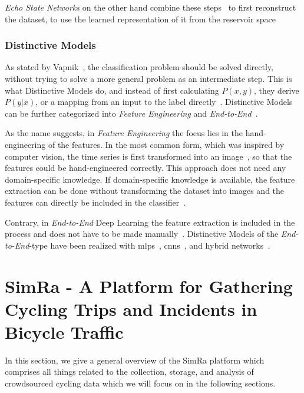 \textit{Echo State Networks} on the other hand combine these steps~\cite{jaeger2001echo} to first reconstruct the dataset, to use the learned representation of it from the reservoir space~\cite{aswolinskiy2018time,bianchi2020reservoir,chouikhi2018genesis,ma2016functional}

\subsubsection*{Distinctive Models}
As stated by Vapnik~\cite{vapnik1998statistical}, the classification problem should be solved directly, without trying to solve a more general problem as an intermediate step.
This is what Distinctive Models do, and instead of first calculating $P(x,y)$, they derive $P(y|x)$, or a mapping from an input to the label directly~\cite{ng2001discriminative}.
Distinctive Models can be further categorized into \textit{Feature Engineering} and \textit{End-to-End}~\cite{ismail2019deep}.

As the name suggests, in \textit{Feature Engineering} the focus lies in the hand-engineering of the features.
In the most common form, which was inspired by computer vision, the time series is first transformed into an image~\cite{wang2015encoding,hatami2018classification,tripathy2018use}, so that the features could be hand-engineered correctly.
This approach does not need any domain-specific knowledge.
If domain-specific knowledge is available, the feature extraction can be done without transforming the dataset into images and the features can directly be included in the classifier~\cite{uemura2018feasibility,ignatov2018real}.

Contrary, in \textit{End-to-End} Deep Learning the feature extraction is included in the process and does not have to be made manually~\cite{nweke2018deep}.
Distinctive Models of the \textit{End-to-End}-type have been realized with \acp{mlp}~\cite{wang2017time,geng2019cost}, \acp{cnn}~\cite{che2017boosting,ismail2018evaluating,liu2018time}, and hybrid networks~\cite{lin2017gcrnn,serra2018towards}.


\section{SimRa - A Platform for Gathering Cycling Trips and Incidents in Bicycle Traffic}
\label{sec:simra}
In this section, we give a general overview of the SimRa platform which comprises all things related to the collection, storage, and analysis of crowdsourced cycling data which we will focus on in the following sections.

